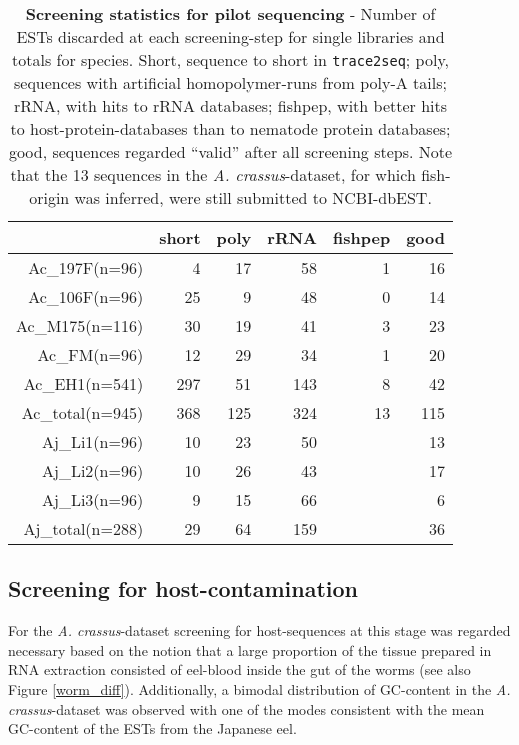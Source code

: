 \small\begin{table}[ht]
\begin{center}
\begin{tabular}{rrrrrr}
  \hline
 & short & poly & rRNA & fishpep & good \\ 
  \hline
Ac\_197F(n=96) &   4 &  17 &  58 &   1 &  16 \\ 
  Ac\_106F(n=96) &  25 &   9 &  48 &   0 &  14 \\ 
  Ac\_M175(n=116) &  30 &  19 &  41 &   3 &  23 \\ 
  Ac\_FM(n=96) &  12 &  29 &  34 &   1 &  20 \\ 
  Ac\_EH1(n=541) & 297 &  51 & 143 &   8 &  42 \\ 
  Ac\_total(n=945) & 368 & 125 & 324 &  13 & 115 \\ 
  Aj\_Li1(n=96) &  10 &  23 &  50 &  &  13 \\ 
  Aj\_Li2(n=96) &  10 &  26 &  43 &  &  17 \\ 
  Aj\_Li3(n=96) &   9 &  15 &  66 &  &   6 \\ 
  Aj\_total(n=288) &  29 &  64 & 159 &  &  36 \\ 
   \hline
\end{tabular}
\caption[Screening statistics for pilot sequencing] {\textbf{Screening
    statistics for pilot sequencing} - Number of ESTs discarded at
  each screening-step for single libraries and totals for
  species. Short, sequence to short in \texttt{trace2seq}; poly,
  sequences with artificial homopolymer-runs from poly-A tails; rRNA,
  with hits to rRNA databases; fishpep, with better hits to
  host-protein-databases than to nematode protein databases; good,
  sequences regarded ``valid'' after all screening steps. Note that
  the 13 sequences in the \textit{A. crassus}-dataset, for which
  fish-origin was inferred, were still submitted to NCBI-dbEST.}

\label{tab:num}
\end{center}
\end{table}
\normalsize

\subsection{Screening for host-contamination}
\label{host-pil}

For the \textit{A. crassus}-dataset screening for host-sequences at
this stage was regarded necessary based on the notion that a large
proportion of the tissue prepared in RNA extraction consisted of
eel-blood inside the gut of the worms (see also Figure
\ref{worm_diff}). Additionally, a bimodal distribution of GC-content
in the \textit{A. crassus}-dataset was observed with one of the modes
consistent with the mean GC-content of the ESTs from the Japanese eel.

